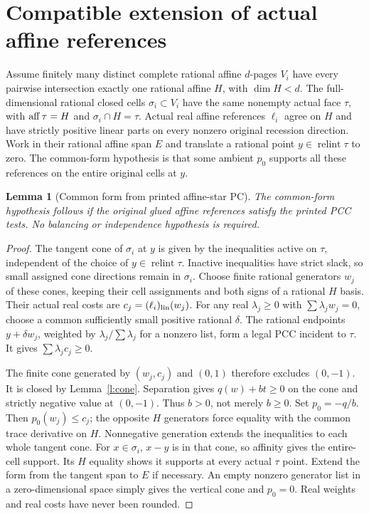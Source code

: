 \documentclass[11pt]{article}
\newtheorem{lemma}[theorem]{Lemma}
\theoremstyle{definition}\newtheorem{definition}[theorem]{Definition}
\theoremstyle{remark}\newtheorem{remark}[theorem]{Remark}
\newcommand{\ri}{\operatorname{relint}}\newcommand{\PC}{\mathrm{PC}}
\begin{document}
\section{Compatible extension of actual affine references}\label{s:reference}
Assume finitely many distinct complete rational affine $d$-pages $V_i$ have every pairwise intersection exactly one rational affine $H$, with $\dim H<d$. The full-dimensional rational closed cells $\sigma_i\subset V_i$ have the same nonempty actual face $\tau$, with $\operatorname{aff}\tau=H$ and $\sigma_i\cap H=\tau$. Actual real affine references $\ell_i$ agree on $H$ and have strictly positive linear parts on every nonzero original recession direction. Work in their rational affine span $E$ and translate a rational point $y\in\ri\tau$ to zero. The common-form hypothesis is that some ambient $p_0$ supports all these references on the entire original cells at $y$.

\begin{lemma}[Common form from printed affine-star PC]\label{l:pzero}
The common-form hypothesis follows if the original glued affine references satisfy the printed PCC tests. No balancing or independence hypothesis is required.
\end{lemma}
\begin{proof}
The tangent cone of $\sigma_i$ at $y$ is given by the inequalities active on $\tau$, independent of the choice of $y\in\ri\tau$. Inactive inequalities have strict slack, so small assigned cone directions remain in $\sigma_i$. Choose finite rational generators $w_j$ of these cones, keeping their cell assignments and both signs of a rational $H$ basis. Their actual real costs are $c_j=(\ell_i)_{\rm lin}(w_j)$. For any real $\lambda_j\geq0$ with $\sum\lambda_jw_j=0$, choose a common sufficiently small positive rational $\delta$. The rational endpoints $y+\delta w_j$, weighted by $\lambda_j/\sum\lambda_j$ for a nonzero list, form a legal PCC incident to $\tau$. It gives $\sum\lambda_jc_j\geq0$.

The finite cone generated by $(w_j,c_j)$ and $(0,1)$ therefore excludes $(0,-1)$. It is closed by Lemma~\ref{l:cone}. Separation gives $q(w)+bt\geq0$ on the cone and strictly negative value at $(0,-1)$. Thus $b>0$, not merely $b\geq0$. Set $p_0=-q/b$. Then $p_0(w_j)\leq c_j$; the opposite $H$ generators force equality with the common trace derivative on $H$. Nonnegative generation extends the inequalities to each whole tangent cone. For $x\in\sigma_i$, $x-y$ is in that cone, so affinity gives the entire-cell support. Its $H$ equality shows it supports at every actual $\tau$ point. Extend the form from the tangent span to $E$ if necessary. An empty nonzero generator list in a zero-dimensional space simply gives the vertical cone and $p_0=0$. Real weights and real costs have never been rounded.
\end{proof}
\end{document}
